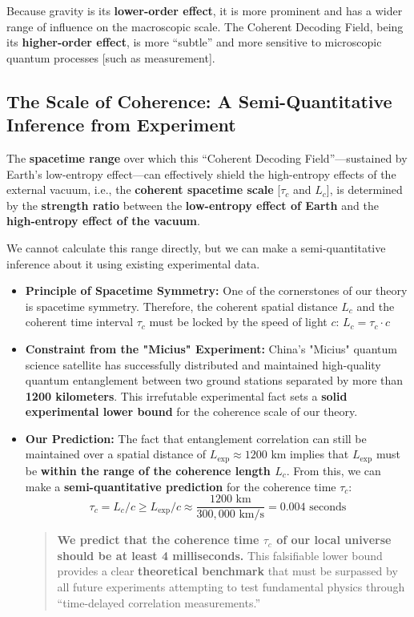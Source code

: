 \documentclass[11pt]{article}
\begin{document}
\noindent Because gravity is its \textbf{lower-order effect}, it is more prominent and has a wider range of influence on the macroscopic scale. The Coherent Decoding Field, being its \textbf{higher-order effect}, is more ``subtle'' and more sensitive to microscopic quantum processes [such as measurement].

\subsection{The Scale of Coherence: A Semi-Quantitative Inference from Experiment}
The \textbf{spacetime range} over which this ``Coherent Decoding Field''—sustained by Earth's low-entropy effect—can effectively shield the high-entropy effects of the external vacuum, i.e., the \textbf{coherent spacetime scale} [$\tau_c$ and $L_c$], is determined by the \textbf{strength ratio} between the \textbf{low-entropy effect of Earth} and the \textbf{high-entropy effect of the vacuum}.

We cannot calculate this range directly, but we can make a semi-quantitative inference about it using existing experimental data.

\begin{itemize}
    \item   \textbf{Principle of Spacetime Symmetry:} One of the cornerstones of our theory is spacetime symmetry. Therefore, the coherent spatial distance $L_c$ and the coherent time interval $\tau_c$ must be locked by the speed of light $c$:
    \textbf{$L_c = \tau_c \cdot c$}

    \item   \textbf{Constraint from the "Micius" Experiment:}
    China's "Micius" quantum science satellite has successfully distributed and maintained high-quality quantum entanglement between two ground stations separated by more than \textbf{1200 kilometers}.
    This irrefutable experimental fact sets a \textbf{solid experimental lower bound} for the coherence scale of our theory.

    \item   \textbf{Our Prediction:}
    The fact that entanglement correlation can still be maintained over a spatial distance of $L_{\text{exp}} \approx 1200$ km implies that $L_{\text{exp}}$ must be \textbf{within the range of the coherence length $L_c$}.
    From this, we can make a \textbf{semi-quantitative prediction} for the coherence time $\tau_c$:
    \[ \tau_c = L_c / c \geq L_{\text{exp}} / c \approx \frac{1200 \text{ km}}{300,000 \text{ km/s}} = 0.004 \text{ seconds} \]
    
    \begin{quote}
        \textbf{We predict that the coherence time $\tau_c$ of our local universe should be at least 4 milliseconds.} This falsifiable lower bound provides a clear \textbf{theoretical benchmark} that must be surpassed by all future experiments attempting to test fundamental physics through ``time-delayed correlation measurements.''
    \end{quote}
\end{itemize}
\end{document}
